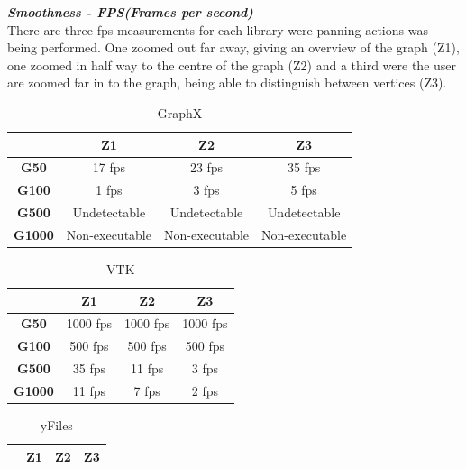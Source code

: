 \documentclass[a4paper,11pt]{kth-mag}
\begin{document}
\begin{appendices}
\newline
\textbf{\textit{Smoothness - FPS(Frames per second)}}\\
\newline
There are three fps measurements for each library were panning actions was being
performed. One zoomed out far away, giving an overview of the graph (Z1), one
zoomed in half way to the centre of the graph (Z2) and a third were the user are
zoomed far in to the graph, being able to distinguish between vertices (Z3).\\
\newline
\begin{table}[h]
\centering
\caption{GraphX}
\begin{tabular}{|c|c|c|c|}
\hline
\multicolumn{1}{|l|}{} & \textbf{Z1}    & \textbf{Z2}    & \textbf{Z3}    \\ \hline
\textbf{G50}           & 17 fps         & 23 fps         & 35 fps         \\ \hline
\textbf{G100}          & 1 fps          & 3 fps          & 5 fps          \\ \hline
\textbf{G500}          & Undetectable   & Undetectable   & Undetectable   \\ \hline
\textbf{G1000}         & Non-executable & Non-executable & Non-executable \\ \hline
\end{tabular}
\label{table-graphx:appendix}
\end{table}
\newline
\begin{table}[h]
\centering
\caption{VTK}
\begin{tabular}{|c|c|c|c|}
\hline
\textbf{}      & \textbf{Z1} & \textbf{Z2} & \textbf{Z3} \\ \hline
\textbf{G50}   & 1000 fps    & 1000 fps    & 1000 fps    \\ \hline
\textbf{G100}  & 500 fps     & 500 fps     & 500 fps     \\ \hline
\textbf{G500}  & 35 fps      & 11 fps      & 3 fps       \\ \hline
\textbf{G1000} & 11 fps      & 7 fps       & 2 fps       \\ \hline
\end{tabular}
\label{table-VTK:appendix}
\end{table}
\newline
\begin{table}[h]
\centering
\caption{yFiles}
\begin{tabular}{|c|c|c|c|}
\hline
\textbf{}      & \textbf{Z1}  & \textbf{Z2}  & \textbf{Z3}  \\ \hline

\end{tabular}
\end{table}
\end{appendices}
\end{document}
